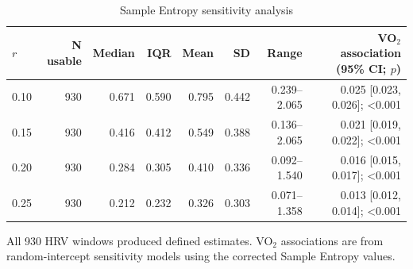 \begin{table}[htbp]
\centering
\begin{threeparttable}
\begin{tabular}{lrrrrrrr}
\toprule
$r$ & N usable & Median & IQR & Mean & SD & Range & VO$_2$ association (95\% CI; $p$) \\
\midrule
0.10 & 930 & 0.671 & 0.590 & 0.795 & 0.442 & 0.239--2.065 & 0.025 [0.023, 0.026]; <0.001 \\
0.15 & 930 & 0.416 & 0.412 & 0.549 & 0.388 & 0.136--2.065 & 0.021 [0.019, 0.022]; <0.001 \\
0.20 & 930 & 0.284 & 0.305 & 0.410 & 0.336 & 0.092--1.540 & 0.016 [0.015, 0.017]; <0.001 \\
0.25 & 930 & 0.212 & 0.232 & 0.326 & 0.303 & 0.071--1.358 & 0.013 [0.012, 0.014]; <0.001 \\
\bottomrule
\end{tabular}\begin{tablenotes}\footnotesize\item All 930 HRV windows produced defined estimates. VO$_2$ associations are from random-intercept sensitivity models using the corrected Sample Entropy values.\end{tablenotes}
\end{threeparttable}
\caption{Sample Entropy sensitivity analysis}
\label{tab:s3-sampen}
\end{table}
